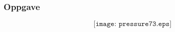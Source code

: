 \documentclass[aspectratio=169,xcolor=dvipsnames]{beamer}
\begin{document}
%
%
%
%
%
%
%
%
%
%
%
%
%
%
%
%
%
\begin{frame}
	\frametitle{Oppgave}

	$$\texttt{[image: pressure73.eps]}$$
\end{frame}
\end{document}
